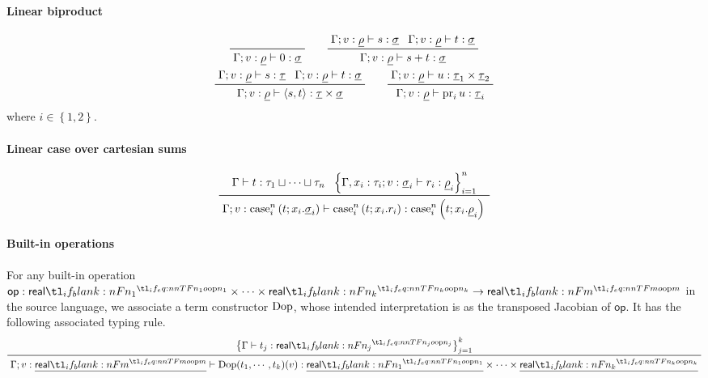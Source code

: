 \documentclass[11pt,a4paper]{article}
\theoremstyle{definition}
\theoremstyle{remark}
\providecommand{\srcop}{\mathsf{op}}
\providecommand{\lintype}[1]{\underline{#1}}
\begin{document}
\paragraph{Linear biproduct}

\begin{equation*}
  \begin{gathered}
  \prftree{}{
    \Gamma ; v : \lintype{\rho} \vdash \opn[b]{0} : \lintype{\sigma}
  }
  \qquad
  \prftree{
    \Gamma; v : \lintype{\rho} \vdash s : \lintype{\sigma}
  }{
    \Gamma; v : \lintype{\rho} \vdash t : \lintype{\sigma}
  }{
    \Gamma; v : \lintype{\rho} \vdash s + t : \lintype{\sigma}
  }
  \\
  \prftree{
    \Gamma; v : \lintype{\rho} \vdash s : \lintype{\tau}
  }{
    \Gamma; v : \lintype{\rho} \vdash t : \lintype{\sigma}
  }{
    \Gamma; v : \lintype{\rho} \vdash \tuple{ s, t } : \lintype{\tau} \times \lintype{\sigma}
  }
  \qquad
  \prftree{
    \Gamma; v : \lintype{\rho} \vdash
    u : \lintype{\tau}_{1} \times \lintype{\tau}_{2}
  }{
    \Gamma; v : \lintype{\rho} \vdash
    \opn[b]{pr}_{i} u : \lintype{\tau}_{i}
  }
  \end{gathered}
\end{equation*}
where \( i \in \left\{ 1, 2 \right\} \).

\paragraph{Linear case over cartesian sums}

\begin{equation*}
  \prftree{
    \Gamma \vdash t : \tau_{1} \sqcup \cdots \sqcup \tau_{n}
  }{
    \left\{
      \Gamma, x_{i} : \tau_{i}; v : \lintype{\sigma}_{i} \vdash r_{i} : \lintype{\rho}_{i}
    \right\}_{i=1}^{n} 
  }
  {
    \Gamma; v:
    \casenst{t}{i}{n}{x_{i}}{\lintype{\sigma}_{i}}
    \vdash
    \casenst{t}{i}{n}{x_{i}}{r_{i}} :
    \casenst{t}{i}{n}{x_{i}}{\lintype{\rho}_{i}}
   }
\end{equation*}

\paragraph{Built-in operations}

For any built-in operation \( \srcop: \srcreal[n_{1}] \times \cdots \times \srcreal[n_{k}] \to \srcreal[m] \) in the source language, we associate a term constructor \( \opn[b]{Dop} \), whose intended interpretation is as the transposed Jacobian of \( \srcop \). It has the following associated typing rule.
\begin{equation*}
  \prftree{
    \left\{
    \Gamma \vdash t_{j} : \srcreal[n_{j}] 
    \right\}_{j = 1}^{k}
  }{
    \Gamma ; v : \lintype{\srcreal[m]} \vdash
    \fn[n]{ \fn[n]{ \opn[b]{Dop} }{ t_{1}, \cdots, t_{k} } }{ v } :
    \lintype{\srcreal[n_{1}]}
    \times \cdots \times
    \lintype{\srcreal[n_{k}]}
  }
\end{equation*}
\end{document}
